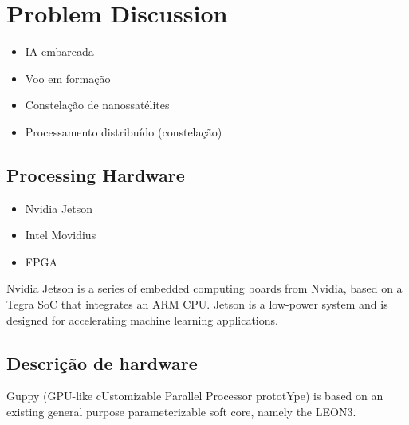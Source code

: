 %
%
%
%
%

%
%
%
%
%

\section{Problem Discussion} \label{sec:problem-discussion}

\cite{marcelino2018}

\cite{marcelino2016}

\begin{itemize}
    \item IA embarcada
    \item Voo em formação
    \item Constelação de nanossatélites
    \item Processamento distribuído (constelação)
\end{itemize}

\subsection{Processing Hardware}

\begin{itemize}
    \item Nvidia Jetson
    \item Intel Movidius
    \item FPGA
\end{itemize}

Nvidia Jetson is a series of embedded computing boards from Nvidia, based on a Tegra SoC that integrates an ARM CPU. Jetson is a low-power system and is designed for accelerating machine learning applications.

\subsection{Descrição de hardware}

Guppy \cite{al-dujaili2012} (GPU-like cUstomizable Parallel Processor prototYpe) is based on an existing general purpose parameterizable soft core, namely the LEON3.

